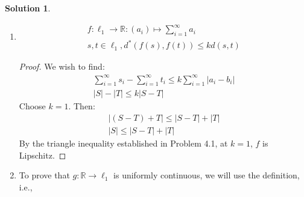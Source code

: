 \documentclass[12pt]{article}
\theoremstyle{definition} %
\newtheorem{solution}{Solution}
\theoremstyle{plain} %
\begin{document}
\begin{solution}
\begin{enumerate}
\begin{enumerate}
\begin{proof}
                    \begin{align}
                        \sum_{i=1}^{\infty} \left\vert a_i -b_{i} \right\vert +\sum_{i=1}^{\infty} \left\vert b_{i}-c_{i}  \right\vert \geq \sum_{i=1}^{\infty} \left\vert a_i -c_{i} \right\vert \\[10pt] 
                        \sum_{i=1}^{\infty} a_i = A, \sum_{i=1}^{\infty} b_i = B, \sum_{i=1}^{\infty} c_i = C \label{hw-5}\\[10pt] 
                        \left\vert A-B \right\vert +\left\vert B-C \right\vert \geq \left\vert A -C \right\vert \\[10pt] 
                        \left\vert A-B \right\vert +\left\vert B-C \right\vert \geq \left\vert (A-B)+(B-C) \right\vert \label{ti}
                    \end{align} 
    Where \autoref{hw-5} is proven in Homework 5 Problem 3.1, and \autoref{ti} is proven by the triangle inequality.
                \end{proof}
            \end{enumerate}
            \item \begin{align}
                f: \ell_1 \to \mathbb{R} : (a_{i}) \mapsto \sum_{i=1}^{\infty} a_{i}\\[10pt] 
                s,t \in \ell_1, d^{*}(f(s), f(t))\leq kd(s,t)
            \end{align}
            \begin{proof}
             We wish to find:
            \begin{align}
                \sum_{i=1}^{\infty} s_{i} - \sum_{i=1}^{\infty} t_{i} \leq k \sum_{i=1}^{\infty} \left\vert a_{i}-b_{i} \right\vert \\[10pt] 
                \left\vert S \right\vert -\left\vert T \right\vert \leq k\left\vert S-T \right\vert 
            \end{align} 
            Choose $k=1$. Then:
            \begin{align}
                \left\vert \left( S-T \right)+T  \right\vert \leq \left\vert S-T \right\vert +\left\vert T \right\vert \\[10pt] 
                \left\vert S \right\vert \leq \left\vert S-T \right\vert +\left\vert T \right\vert 
            \end{align}
            By the triangle inequality established in Problem 4.1, at $k = 1$, $f$ is Lipschitz. 
            \end{proof}
            \item To prove that $g: \mathbb{R} \to \ell_1$ is uniformly continuous, we will use the definition, i.e., 

\end{enumerate}
\end{solution}
\end{document}

